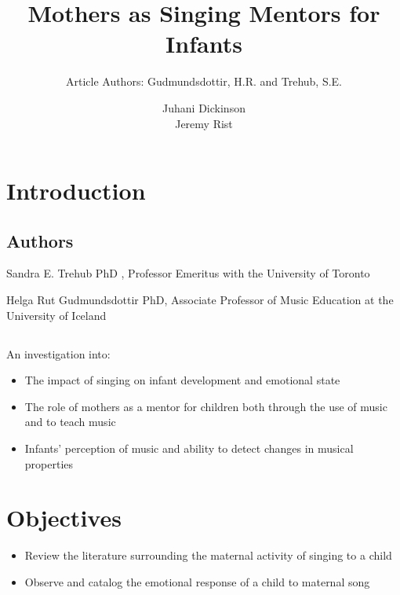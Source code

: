 \documentclass{beamer}
\title{Mothers as Singing Mentors for Infants}
\subtitle{Article Authors: Gudmundsdottir, H.R. and Trehub, S.E.}
\author{Juhani Dickinson \\ Jeremy Rist}
\begin{document}
\frame{\titlepage}

\section{Introduction}

\subsection{Authors}
\begin{frame}
	Sandra E. Trehub PhD , Professor Emeritus with the University of Toronto\pause

	Helga Rut Gudmundsdottir PhD, Associate Professor of Music Education at the University of Iceland
\end{frame}

\subsection*{}
\begin{frame}
	An investigation into:
	\begin{itemize}
		\item The impact of singing on infant development and emotional state
			\pause
		\item The role of mothers as a mentor for children both through the use of music and to teach music
			\pause
		\item Infants' perception of music and ability to detect changes in musical properties
	\end{itemize}
\end{frame}

\section{Objectives}
\begin{frame}
	\begin{itemize}
		\item Review the literature surrounding the maternal activity of singing to a child
			\pause
		\item Observe and catalog the emotional response of a child to maternal song
	\end{itemize}
\end{frame}
\end{document}

